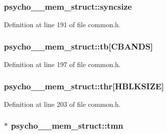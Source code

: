 \subsubsection[{\texorpdfstring{syncsize}{syncsize}}]{ psycho\+\_\+\_\+mem\+\_\+struct\+::syncsize}\hypertarget{structpsycho__4__mem__struct_a9a6176669add5d8d80ca1c4c28848f72}{}\label{structpsycho__4__mem__struct_a9a6176669add5d8d80ca1c4c28848f72}


Definition at line 191 of file common.\+h.

\subsubsection[{\texorpdfstring{tb}{tb}}]{ psycho\+\_\+\_\+mem\+\_\+struct\+::tb\mbox{[}{\bf C\+B\+A\+N\+DS}\mbox{]}}\hypertarget{structpsycho__4__mem__struct_aa17ba0a8855521cd526a2e6f1ec300e1}{}\label{structpsycho__4__mem__struct_aa17ba0a8855521cd526a2e6f1ec300e1}


Definition at line 197 of file common.\+h.

\subsubsection[{\texorpdfstring{thr}{thr}}]{ psycho\+\_\+\_\+mem\+\_\+struct\+::thr\mbox{[}{\bf H\+B\+L\+K\+S\+I\+ZE}\mbox{]}}\hypertarget{structpsycho__4__mem__struct_af85b244e64f5edcbbe2012b2c65ebfe2}{}\label{structpsycho__4__mem__struct_af85b244e64f5edcbbe2012b2c65ebfe2}


Definition at line 203 of file common.\+h.

\subsubsection[{\texorpdfstring{tmn}{tmn}}]{$\ast$ psycho\+\_\+\_\+mem\+\_\+struct\+::tmn}\hypertarget{structpsycho__4__mem__struct_a1fc30790e9beec1cf1abb609e3829760}{}\label{structpsycho__4__mem__struct_a1fc30790e9beec1cf1abb609e3829760}


